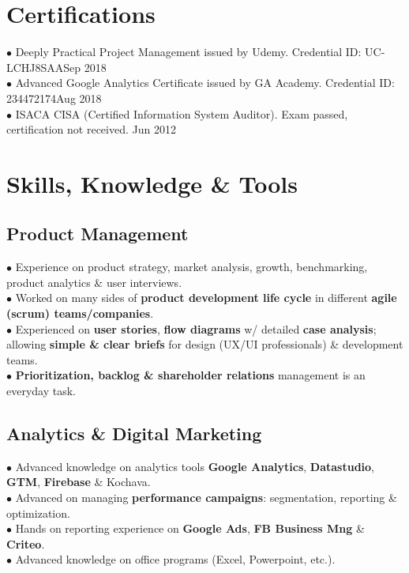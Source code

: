 \documentclass[11pt,twoside,a4paper]{article}
\begin{document}
  \section{Certifications}
    $\bullet$ Deeply Practical Project Management issued by Udemy. Credential ID: UC-LCHJ8SAA\hfill Sep 2018\\
    $\bullet$ Advanced Google Analytics Certificate issued by GA Academy. Credential ID: 234472174\hfill Aug 2018\\
    $\bullet$ ISACA CISA (Certified Information System Auditor). Exam passed, certification not received. \hfill Jun 2012
  \section{Skills, Knowledge \& Tools}
    \subsection{Product Management}
      $\bullet$ Experience on product strategy, market analysis, growth, benchmarking, product analytics \& user interviews.\\
      $\bullet$ Worked on many sides of \textbf{product development life cycle} in different \textbf{agile (scrum) teams/companies}.\\
      $\bullet$ Experienced on \textbf{user stories}, \textbf{flow diagrams} w/ detailed \textbf{case analysis}; allowing \textbf{simple \& clear briefs} for design (UX/UI professionals) \& development teams.\\
      $\bullet$ \textbf{Prioritization, backlog \& shareholder relations} management is an everyday task.
    \subsection{Analytics \& Digital Marketing}
      $\bullet$ Advanced knowledge on analytics tools \textbf{Google Analytics}, \textbf{Datastudio}, \textbf{GTM}, \textbf{Firebase} \& Kochava.\\
      $\bullet$ Advanced on managing \textbf{performance campaigns}: segmentation, reporting \& optimization.\\
      $\bullet$ Hands on reporting experience on \textbf{Google Ads}, \textbf{FB Business Mng} \& \textbf{Criteo}.\\
      $\bullet$ Advanced knowledge on office programs (Excel, Powerpoint, etc.).
\end{document}

